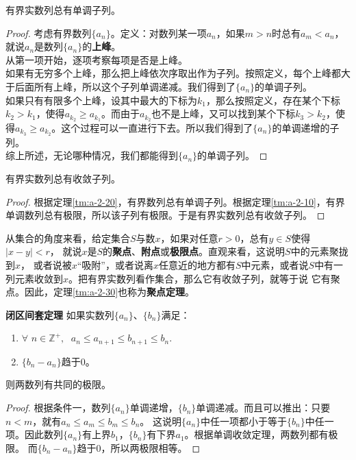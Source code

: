 \documentclass[12pt,UTF8,fontset=none]{ctexbook}
\begin{document}
\begin{appendix}
\begin{tm}\label{tm:a-2-20}
    有界实数列总有单调子列。
\end{tm}
\begin{proof}
    考虑有界数列$\{a_n\}$。定义：对数列某一项$a_n$，如果$m>n$时总有$a_m < a_n$，就说$a_n$是数列$\{a_n\}$的\textbf{上峰}。\\
    从第一项开始，逐项考察每项是否是上峰。\\
    如果有无穷多个上峰，那么把上峰依次序取出作为子列。按照定义，每个上峰都大于后面所有上峰，所以这个子列单调递减。我们得到了$\{a_n\}$的单调子列。\\
    如果只有有限多个上峰，设其中最大的下标为$k_1$，那么按照定义，存在某个下标$k_2 > k_1$，使得$a_{k_2} \geqslant a_{k_1}$。而由于$a_{k_2}$也不是上峰，又可以找到某个下标$k_3 > k_2$，使得$a_{k_3} \geqslant a_{k_2}$。这个过程可以一直进行下去。所以我们得到了$\{a_n\}$的单调递增的子列。\\
    综上所述，无论哪种情况，我们都能得到$\{a_n\}$的单调子列。
\end{proof}

\begin{tm}\label{tm:a-2-30}
    有界实数列总有收敛子列。
\end{tm}
\begin{proof}
    根据定理\ref{tm:a-2-20}，有界数列总有单调子列。根据定理\ref{tm:a-2-10}，有界单调数列总有极限，所以该子列有极限。于是有界实数列总有收敛子列。
\end{proof}

从集合的角度来看，给定集合$S$与数$x$，如果对任意$r>0$，总有$y\in S$使得$|x - y| < r$，
就说$x$是$S$的\textbf{聚点}、\textbf{附点}或\textbf{极限点}。直观来看，这说明$S$中的元素聚拢到$x$，
或者说被$x$“吸附”，或者说离$x$任意近的地方都有$S$中元素，或者说$S$中有一列元素收敛到$x$。把有界实数列看作集合，那么它有收敛子列，就等于说
它有聚点。因此，定理\ref{tm:a-2-30}也称为\textbf{聚点定理}。

\begin{tm}\textbf{闭区间套定理}\label{tm:a-2-40}
    如果实数列$\{a_n\}$、$\{b_n\}$满足：
    \begin{enumerate}
        \item $\forall\,\, n\in\mathbb{Z}^+, \;\,\, a_n \leqslant a_{n+1} \leqslant b_{n+1} \leqslant b_n.$
        \item $\{b_n - a_n\}$趋于$0$。
    \end{enumerate}
    则两数列有共同的极限。
\end{tm}
\begin{proof}
    根据条件一，数列$\{a_n\}$单调递增，$\{b_n\}$单调递减。而且可以推出：只要$n<m$，就有$a_n \leqslant a_{m} \leqslant b_{m} \leqslant b_n$。
    这说明$\{a_n\}$中任一项都小于等于$\{b_n\}$中任一项。因此数列$\{a_n\}$有上界$b_1$，$\{b_n\}$有下界$a_1$。根据单调收敛定理，两数列都有极限。
    而$\{b_n - a_n\}$趋于$0$，所以两极限相等。
\end{proof}


\end{appendix}
\end{document}
